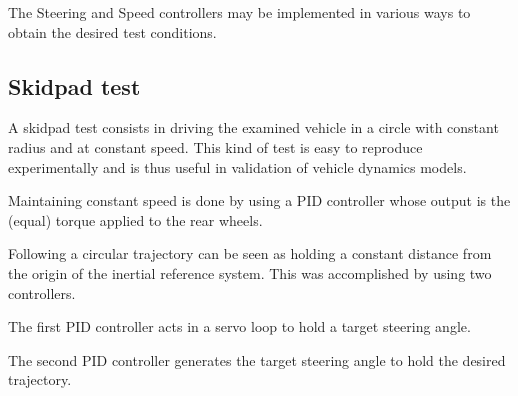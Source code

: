 The Steering and Speed controllers may be implemented in various ways to obtain the desired test conditions.

\subsection{Skidpad test}
A skidpad test consists in driving the examined vehicle in a circle with constant radius and at constant speed. This kind of test is easy to reproduce experimentally and is thus useful in validation of vehicle dynamics models. 

Maintaining constant speed is done by using a PID controller whose output is the (equal) torque applied to the rear wheels.

Following a circular trajectory can be seen as holding a constant distance from the origin of the inertial reference system. This was accomplished by using two controllers.

The first PID controller acts in a servo loop to hold a target steering angle.

The second PID controller generates the target steering angle to hold the desired trajectory.
